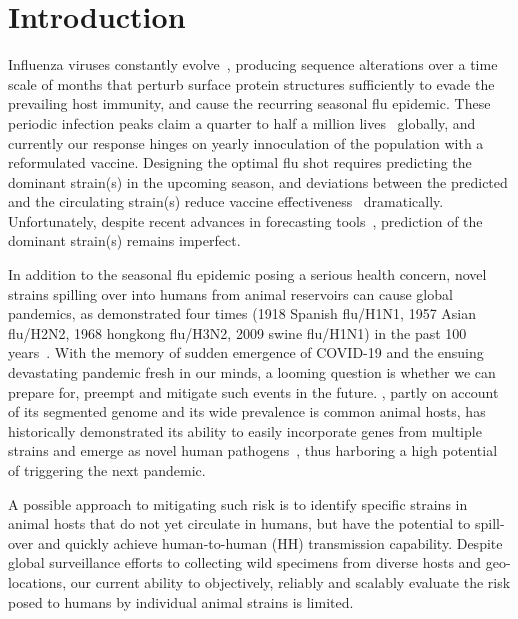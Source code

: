 \documentclass[onecolumn, compsoc,10pt]{IEEEtran}
\begin{document}
\vspace{10pt}
\section*{Introduction}

Influenza viruses constantly evolve~\cite{dos2016influenza},  producing  sequence alterations over a time scale of months  that  perturb surface protein structures sufficiently to evade the prevailing host immunity, and cause the  recurring seasonal flu epidemic. These periodic  infection peaks claim a quarter to half a million lives~\cite{huddleston2020integrating} globally,  and currently our response hinges on  yearly innoculation of the  population with a  reformulated  vaccine.  Designing the optimal flu shot requires predicting the dominant  strain(s)  in the upcoming season, and deviations between the predicted and the circulating strain(s)  reduce  vaccine effectiveness~\cite{tricco2013comparing} dramatically. Unfortunately,  despite  recent advances in forecasting tools~\cite{neher2014predicting,huddleston2020integrating}, prediction of the dominant strain(s) remains imperfect. 



In addition to  the seasonal flu epidemic posing a serious health concern, novel \infl strains spilling over into humans from animal reservoirs can cause global pandemics, as demonstrated four times (1918 Spanish flu/H1N1, 1957 Asian flu/H2N2, 1968 hongkong flu/H3N2, 2009 swine flu/H1N1) in the past 100 years~\cite{shao2017evolution}. With the memory of sudden emergence of   COVID-19 and the ensuing devastating pandemic fresh in our minds, a looming question  is whether we can prepare for, preempt and mitigate such events in the future.  \infl,  partly on account of its segmented genome and its wide prevalence is common animal hosts, has historically demonstrated its ability to easily incorporate genes from multiple strains and emerge as novel human pathogens~\cite{reid2003origin,vergara2014ns},  thus harboring  a high potential  of triggering the next  pandemic.

A possible approach to mitigating such risk is to identify specific strains in animal hosts that do not yet circulate in humans, but have the potential to spill-over and quickly achieve human-to-human (HH) transmission capability. Despite global surveillance efforts to  collecting wild specimens from diverse hosts and geo-locations, our  current ability to objectively, reliably and scalably  evaluate the risk posed to  humans by  individual animal  strains  is limited.
\end{document}
